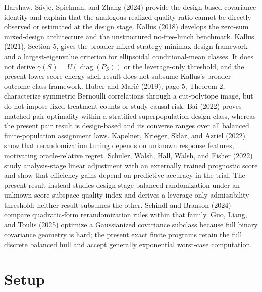 \documentclass{article}
\begin{document}
Harshaw, Sävje, Spielman, and Zhang (2024) provide the design-based covariance identity and explain that the analogous realized quality ratio cannot be directly observed or estimated at the design stage. Kallus (2018) develops the zero-sum mixed-design architecture and the unstructured no-free-lunch benchmark. Kallus (2021), Section 5, gives the broader mixed-strategy minimax-design framework and a largest-eigenvalue criterion for ellipsoidal conditional-mean classes. It does not derive \(\gamma(S)=U(\operatorname{diag}(P_S))\) or the leverage-only threshold, and the present lower-score-energy-shell result does not subsume Kallus's broader outcome-class framework. Huber and Marić (2019), page 5, Theorem 2, characterize symmetric Bernoulli correlations through a cut-polytope image, but do not impose fixed treatment counts or study causal risk. Bai (2022) proves matched-pair optimality within a stratified superpopulation design class, whereas the present pair result is design-based and its converse ranges over all balanced finite-population assignment laws. Kapelner, Krieger, Sklar, and Azriel (2022) show that rerandomization tuning depends on unknown response features, motivating oracle-relative regret. Schuler, Walsh, Hall, Walsh, and Fisher (2022) study analysis-stage linear adjustment with an externally trained prognostic score and show that efficiency gains depend on predictive accuracy in the trial. The present result instead studies design-stage balanced randomization under an unknown score-subspace quality index and derives a leverage-only admissibility threshold; neither result subsumes the other. Schindl and Branson (2024) compare quadratic-form rerandomization rules within that family. Guo, Liang, and Toulis (2025) optimize a Gaussianized covariance subclass because full binary covariance geometry is hard; the present exact finite programs retain the full discrete balanced hull and accept generally exponential worst-case computation.

\section{Setup}
\end{document}
